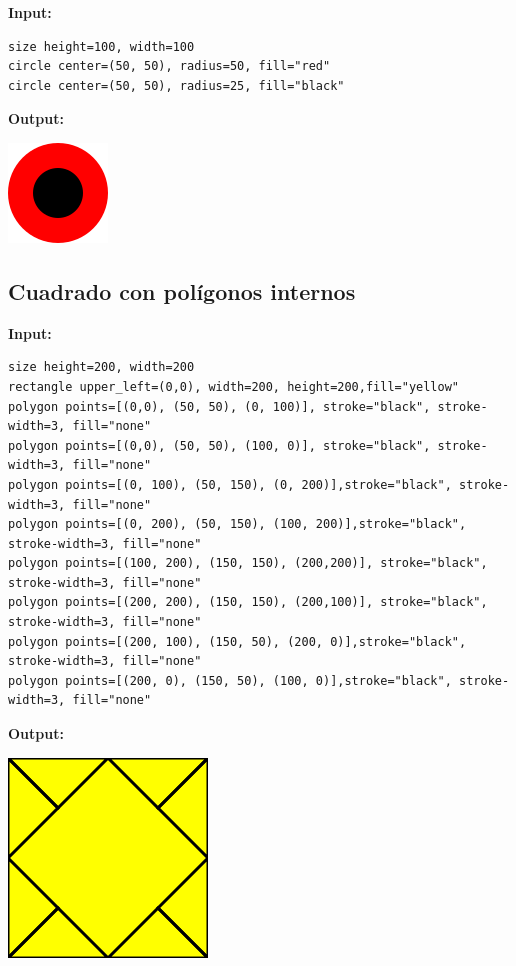 \documentclass{article}
\theoremstyle{definition}
\theoremstyle{remark}
\begin{document}
\textbf{Input:}
\begin{lstlisting}
size height=100, width=100
circle center=(50, 50), radius=50, fill="red"
circle center=(50, 50), radius=25, fill="black"
\end{lstlisting}

\textbf{Output:}

\includegraphics{1.png}

\subsection{Cuadrado con polígonos internos}

\textbf{Input:}
\begin{lstlisting}
size height=200, width=200
rectangle upper_left=(0,0), width=200, height=200,fill="yellow"
polygon points=[(0,0), (50, 50), (0, 100)], stroke="black", stroke-width=3, fill="none"
polygon points=[(0,0), (50, 50), (100, 0)], stroke="black", stroke-width=3, fill="none"
polygon points=[(0, 100), (50, 150), (0, 200)],stroke="black", stroke-width=3, fill="none"
polygon points=[(0, 200), (50, 150), (100, 200)],stroke="black", stroke-width=3, fill="none"
polygon points=[(100, 200), (150, 150), (200,200)], stroke="black", stroke-width=3, fill="none"
polygon points=[(200, 200), (150, 150), (200,100)], stroke="black", stroke-width=3, fill="none"
polygon points=[(200, 100), (150, 50), (200, 0)],stroke="black", stroke-width=3, fill="none"
polygon points=[(200, 0), (150, 50), (100, 0)],stroke="black", stroke-width=3, fill="none"
\end{lstlisting}

\textbf{Output:}

\includegraphics{2.png}
\end{document}
